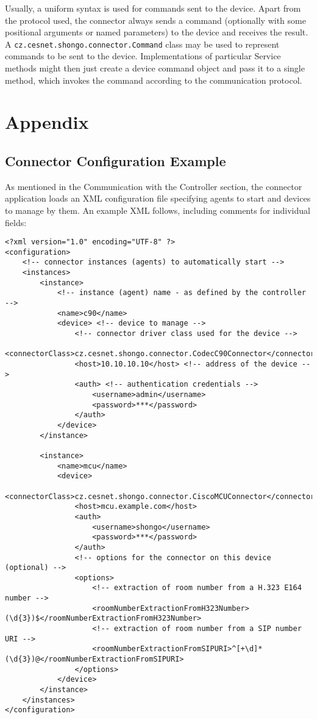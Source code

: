 Usually, a uniform syntax is used for commands sent to the device. Apart from the protocol used, the connector always sends a command (optionally with some positional arguments or named parameters) to the device and receives the result. A \texttt{cz.cesnet.shongo.connector.Command} class may be used to represent commands to be sent to the device. Implementations of particular Service methods might then just create a device command object and pass it to a single method, which invokes the command according to the communication protocol.



\appendix

\chapter{Appendix}

\section{Connector Configuration Example} \label{appendix:connector-config-example}

As mentioned in the Communication with the Controller section, the connector application loads an XML configuration file specifying agents to start and devices to manage by them. An example XML follows, including comments for individual fields:

{ \small
\begin{verbatim}
<?xml version="1.0" encoding="UTF-8" ?>
<configuration>
    <!-- connector instances (agents) to automatically start -->
    <instances>
        <instance>
            <!-- instance (agent) name - as defined by the controller -->
            <name>c90</name>
            <device> <!-- device to manage -->
                <!-- connector driver class used for the device -->
                <connectorClass>cz.cesnet.shongo.connector.CodecC90Connector</connectorClass>
                <host>10.10.10.10</host> <!-- address of the device -->
                <auth> <!-- authentication credentials -->
                    <username>admin</username>
                    <password>***</password>
                </auth>
            </device>
        </instance>

        <instance>
            <name>mcu</name>
            <device>
                <connectorClass>cz.cesnet.shongo.connector.CiscoMCUConnector</connectorClass>
                <host>mcu.example.com</host>
                <auth>
                    <username>shongo</username>
                    <password>***</password>
                </auth>
                <!-- options for the connector on this device (optional) -->
                <options>
                    <!-- extraction of room number from a H.323 E164 number -->
                    <roomNumberExtractionFromH323Number>(\d{3})$</roomNumberExtractionFromH323Number>
                    <!-- extraction of room number from a SIP number URI -->
                    <roomNumberExtractionFromSIPURI>^[+\d]*(\d{3})@</roomNumberExtractionFromSIPURI>
                </options>
            </device>
        </instance>
    </instances>
</configuration>
\end{verbatim}
}


